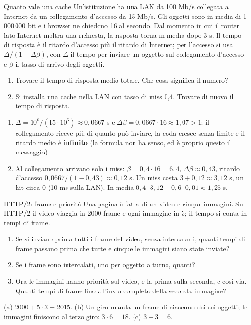 \begin{esercizio}{Quanto vale una cache}
Un'istituzione ha una LAN da 100 Mb/s collegata a Internet da un collegamento d'accesso da 15 Mb/s. Gli oggetti sono in media di
1\,000\,000 bit e i browser ne chiedono 16 al secondo. Dal momento in cui il router lato Internet inoltra una richiesta, la risposta
torna in media dopo 3 s. Il tempo di risposta è il ritardo d'accesso più il ritardo di Internet; per l'accesso si usa
$\Delta/(1 - \Delta\beta)$, con $\Delta$ il tempo per inviare un oggetto sul collegamento d'accesso e $\beta$ il tasso di arrivo degli
oggetti.
\begin{enumerate}[label=(\alph*)]
    \item Trovare il tempo di risposta medio totale. Che cosa significa il numero?
    \item Si installa una cache nella LAN con tasso di miss 0,4. Trovare di nuovo il tempo di risposta.
\end{enumerate}

\svolgimento
\begin{enumerate}[label=(\alph*)]
    \item $\Delta = 10^6/(15 \cdot 10^6) \approx 0{,}0667$ s e $\Delta\beta = 0{,}0667 \cdot 16 \approx 1{,}07 > 1$: il collegamento riceve
          più di quanto può inviare, la coda cresce senza limite e il ritardo medio è \textbf{infinito} (la formula non ha senso, ed è
          proprio questo il messaggio).
    \item Al collegamento arrivano solo i miss: $\beta = 0{,}4 \cdot 16 = 6{,}4$, $\Delta\beta \approx 0{,}43$, ritardo d'accesso
          $0{,}0667/(1 - 0{,}43) \approx 0{,}12$ s. Un miss costa $3 + 0{,}12 \approx 3{,}12$ s, un hit circa 0 (10 ms sulla LAN). In media
          $0{,}4 \cdot 3{,}12 + 0{,}6 \cdot 0{,}01 \approx 1{,}25$ s.
\end{enumerate}
\end{esercizio}

\begin{esercizio}{HTTP/2: frame e priorità}
Una pagina è fatta di un video e cinque immagini. Su HTTP/2 il video viaggia in 2000 frame e ogni immagine in 3; il tempo si conta in
tempi di frame.
\begin{enumerate}[label=(\alph*)]
    \item Se si inviano prima tutti i frame del video, senza intercalarli, quanti tempi di frame passano prima che tutte e cinque le
          immagini siano state inviate?
    \item Se i frame sono intercalati, uno per oggetto a turno, quanti?
    \item Ora le immagini hanno priorità sul video, e la prima sulla seconda, e così via. Quanti tempi di frame fino all'invio completo
          della seconda immagine?
\end{enumerate}

\svolgimento
(a) $2000 + 5 \cdot 3 = 2015$. (b) Un giro manda un frame di ciascuno dei sei oggetti; le immagini finiscono al terzo giro: $3 \cdot 6 =
18$. (c) $3 + 3 = 6$.
\end{esercizio}

